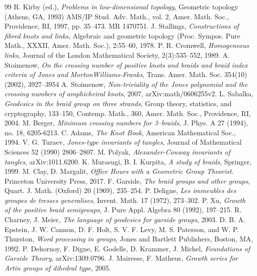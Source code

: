 \documentclass[11pt]{amsart}
\theoremstyle{plain}
\theoremstyle{definition}
\numberwithin{equation}{section}
\begin{document}
\begin{thebibliography}{99}
 R. Kirby (ed.), {\it Problems in low-dimensional topology}, Geometric topology (Athens, GA, 1993) AMS/IP Stud. Adv. Math., vol. 2, Amer. Math. Soc., Providence, RI, 1997, pp. 35–473. MR 1470751.
 J. Stallings, {\it Constructions of fibred knots and links}, Algebraic and geometric topology (Proc. Sympos. Pure Math., XXXII, Amer. Math. Soc.), 2:55–60, 1978.
 P. R. Cromwell, {\it Homogeneous links}, Journal of the London Mathematical Society, 2(3):535–552, 1989.
 A. Stoimenow, {\it On the crossing number of positive knots and braids and braid index criteria of Jones and MortonWilliams-Franks}, Trans. Amer. Math. Soc. 354(10) (2002), 3927–3954
 A. Stoimenow, {\it Non-triviality of the Jones polynomial and the crossing numbers of amphicheiral knots}, 2007, arXiv:math/0606255v2.
 L. Sabalka, {\it Geodesics in the braid group on three strands}, Group theory, statistics, and cryptography, 133–150, Contemp. Math., 360, Amer. Math. Soc., Providence, RI, 2004.
 M. Berger, {\it Minimum crossing numbers for 3--braids}, J. Phys. A 27 (1994), no. 18, 6205-6213.
 C. Adams, {\it The Knot Book}, American Mathematical Soc., 1994.
 V. G. Turaev, {\it Jones-type invariants of tangles}, Journal of Mathematical Sciences 52 (1990) 2806–2807.
 M. Polyak, {\it Alexander-Conway invariants of tangles}, arXiv:1011.6200.
 K. Murasugi, B. I. Kurpita, {\it A study of braids}, Springer, 1999.
 M. Clay, D. Margalit, {\it Office Hours with a Geometric Group Theorist}. Princeton University Press, 2017.
F. Garside, {\it The braid groups and other groups}, Quart. J. Math. (Oxford) 20 (1969), 235–254.
 P. Deligne, {\it Les immeubles des groupes de tresses generalises}, Invent. Math. 17 (1972), 273--302.
 P. Xu, {\it Growth of the positive braid semigroups}, J. Pure Appl. Algebra 80 (1992), 197--215.
 R. Charney, J. Meier, {\it The language of geodesics for garside groups}, 2003.
 D. B. A. Epstein, J. W. Cannon, D. F. Holt, S. V. F. Levy, M. S. Paterson, and W. P. Thurston, {\it Word processing in groups}, Jones and Bartlett Publishers, Boston, MA, 1992.
 P. Dehornoy, F. Digne, E. Godelle, D. Krammer, J. Michel, {\it Foundations of Garside Theory}, arXiv:1309.0796.
 J. Mairesse, F. Matheus, {\it Growth series for Artin groups of dihedral type}, 2005.

\end{thebibliography}
\end{document}
